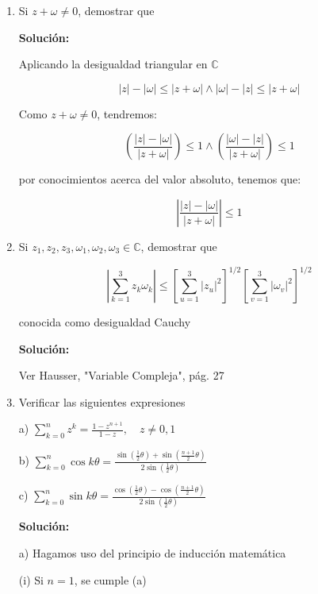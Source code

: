 \documentclass[a4paper,12pt]{article}
\begin{document}
\begin{enumerate}
circunferencia

    \item Si \(z + \omega \neq 0\), demostrar que

\textbf{Solución:}

Aplicando la desigualdad triangular en \(\mathbb{C}\)

\[ \left| z \right| - \left| \omega \right| \leq \left| z + \omega \right| \wedge \left| \omega \right| - \left| z \right| \leq \left| z + \omega \right| \]

Como \(z + \omega \neq 0\), tendremos:

\[ \left( \frac{\left| z \right| - \left| \omega \right|}{\left| z + \omega \right|} \right) \leq 1 \wedge \left( \frac{\left| \omega \right| - \left| z \right|}{\left| z + \omega \right|} \right) \leq 1 \]

por conocimientos acerca del valor absoluto, tenemos que:

\[ \left| \frac{\left| z \right| - \left| \omega \right|}{\left| z + \omega \right|} \right| \leq 1 \]

    \item Si \(z_1, z_2, z_3, \omega_1, \omega_2, \omega_3 \in \mathbb{C}\), demostrar que

\[ \left| \sum_{k=1}^{3} z_k \omega_k \right| \leq \left[ \sum_{u=1}^{3} \left| z_u \right|^2 \right]^{1/2} \left[ \sum_{v=1}^{3} \left| \omega_v \right|^2 \right]^{1/2} \]

conocida como desigualdad Cauchy

\textbf{Solución:}

Ver Hausser, "Variable Compleja", pág. 27

    \item Verificar las siguientes expresiones

a) \(\sum_{k=0}^{n} z^k = \frac{1 - z^{n+1}}{1 - z}, \quad z \neq 0, 1\)

b) \(\sum_{k=0}^{n} \cos k \theta = \frac{\sin \left( \frac{1}{2} \theta \right) + \sin \left( \frac{n+1}{2} \theta \right)}{2 \sin \left( \frac{1}{2} \theta \right)}\)

c) \(\sum_{k=0}^{n} \sin k \theta = \frac{\cos \left( \frac{1}{2} \theta \right) - \cos \left( \frac{n+1}{2} \theta \right)}{2 \sin \left( \frac{1}{2} \theta \right)}\)

\textbf{Solución:}

a) Hagamos uso del principio de inducción matemática

(i) Si \(n = 1\), se cumple (a)


\end{enumerate}
\end{document}
